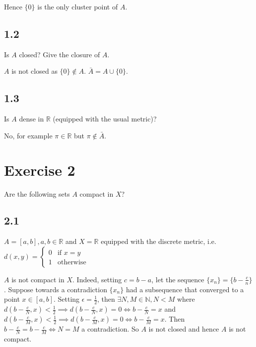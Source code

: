 \documentclass[12pt,a4paper]{article}
\newcommand{\N}{\mathbb{N}}
\newcommand{\R}{\mathbb{R}}
\theoremstyle{plain}
\theoremstyle{remark}
\theoremstyle{definition}
\begin{document}
	Hence $\{0\}$ is the only cluster point of $A$.
	
\subsection*{1.2}
\begin{ques}
	Is $A$ closed? Give the closure of $A$.
\end{ques}	
	
	$A$ is not closed as $\{0\} \not\in A$. $\bar{A} = A \cup \{0\}$.
	
\subsection*{1.3}
\begin{ques}
	Is $A$ dense in $\R$ (equipped with the usual metric)?
\end{ques}
	
	No, for example $\pi \in \R$ but $\pi \not\in \bar{A}$.
	
\pagebreak
\section*{Exercise 2}
\begin{ques}
	Are the following sets $A$ compact in $X$?
\end{ques}

\subsection*{2.1}
\begin{ques}
	$A = [a,b],a,b \in \R$ and $X = \R$ equipped with the discrete metric, i.e. $d(x,y) = \begin{cases}
	0 & \text{if } x = y \\
	1 & \text{otherwise}
	\end{cases}$
\end{ques}
	
	$A$ is not compact in $X$. Indeed, setting $c = b-a$, let the sequence $\{x_n\} = \{b- \frac{c}{n}\}$. Suppose towards a contradiction $\{x_n\}$ had a subsequence that converged to a point $x \in [a,b]$. Setting $\epsilon = \frac{1}{2}$, then $\exists N,M \in \N, N<M$ where $d(b-\frac{c}{N},x) < \frac{1}{2} \implies d(b- \frac{c}{N},x) = 0 \Leftrightarrow b- \frac{c}{N} = x$ and $d(b-\frac{c}{M},x) < \frac{1}{2} \implies d(b-\frac{c}{M},x) = 0 \Leftrightarrow b-\frac{c}{M} = x$. Then $b-\frac{c}{N} = b-\frac{c}{M} \Leftrightarrow N = M$ a contradiction. So $A$ is not closed and hence $A$ is not compact.
	
\end{document}

